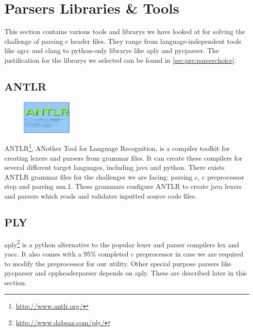 \section{Parsers Libraries \& Tools}
\label{sec:pre:parser}
This section contains various tools and \glspl{library} we have looked at for solving
the challenge of parsing \Gls{c} \gls{header} files. They range from language-independent
tools like \Gls{agcc} and \Gls{clang} to \Gls{python}-only \glspl{library} like \Gls{aply} and \gls{pycparser}. The
justification for the \glspl{library} we selected can be found in
\autoref{sec:pre:parserchoice}.

\subsection{ANTLR}
\label{sec:pre:antlr}
\begin{figure}
	\vspace{-20pt}
	\includegraphics[width=2.5cm]{./planning/img/antlr_logo}
	\vspace{-20pt}
\end{figure}
ANTLR\footnote{\url{http://www.antlr.org/}}, ANother Tool for Language
Recognition, is a compiler toolkit for creating \glspl{lexer} and \glspl{parser} from grammar
files. It can create these compilers for several different target languages,
including \Gls{java} and \Gls{python}. There exists ANTLR grammar files for the challenges
we are facing: parsing \Gls{c}, \Gls{c} \gls{preprocessor} step and parsing \Gls{asn.1}. These grammars
configure ANTLR to create \Gls{java} \glspl{lexer} and \glspl{parser} which reads and validates
inputted source code files.

\subsection{PLY}
\Gls{aply}\footnote{\url{http://www.dabeaz.com/ply/}} is a \Gls{python} alternative to the
popular \gls{lexer} and \gls{parser} compilers lex and yacc. It also comes with a 95\%
completed \Gls{c} \gls{preprocessor} in case we are required to modify the \gls{preprocessor}
for our \gls{utility}. Other special purpose \glspl{parser} like \gls{pycparser} and
cppheaderparser depends on \Gls{aply}. These are described later in this section.

